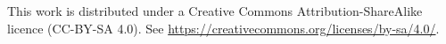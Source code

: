 \newpage
\vspace*{\fill}
This work is distributed under a Creative Commons Attribution-ShareAlike licence (CC-BY-SA 4.0). See \url{https://creativecommons.org/licenses/by-sa/4.0/}.
\newpage